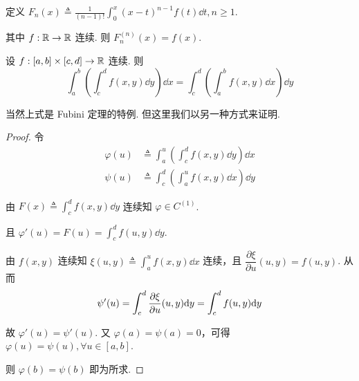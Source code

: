 \begin{example}
    定义 $F_n(x)\triangleq\displaystyle\frac{1}{(n-1)!}\int_0^x(x-t)^{n-1}f(t)\dd t,n\ge 1$.

    其中 $f:\mathbb{R}\to\mathbb{R}$ 连续. 则 $F_n^{(n)}(x)=f(x)$.
\end{example}


\begin{property}
    设 $f:[a,b]\times[c,d]\to\mathbb{R}$ 连续. 则
$$
\int_a^b\left(\int_c^d f(x,y)\dd y\right)\dd x=\int_c^d\left(\int_a^b f(x,y)\dd x\right)\dd y
$$
\end{property}

\begin{hint}
    当然上式是 Fubini 定理的特例. 但这里我们以另一种方式来证明.
\end{hint}

\begin{proof}
    令
$$
\begin{aligned}
    \varphi(u)&\triangleq\int_a^u\left(\int_c^d f(x,y)\dd y\right)\dd x\\
    \psi(u)&\triangleq\int_c^d\left(\int_a^uf(x,y)\dd x\right)\dd y
\end{aligned}
$$

    由 $F(x)\triangleq\displaystyle\int_c^df(x,y)\dd y$ 连续知 $\varphi\in C^{(1)}$.

    且 $\varphi'(u)=F(u)=\displaystyle\int_c^d f(u,y)\dd y$.

    由 $f(x,y)$ 连续知 $\xi(u,y)\triangleq\displaystyle\int_a^uf(x,y)\dd x$ 连续，且 $\dfrac{\partial \xi}{\partial u}(u,y)=f(u,y)$. 从而
$$
\psi'(u)=\int_c^d\frac{\partial{\xi}}{\partial{u}}(u,y)\mathrm{d} y=\int_c^df(u,y)\mathrm{d} y
$$

    故 $\varphi'(u)=\psi'(u)$. 又 $\varphi(a)=\psi(a)=0$，可得 $\varphi(u)=\psi(u),\forall u\in[a,b]$.

    则 $\varphi(b)=\psi(b)$ 即为所求.
\end{proof}